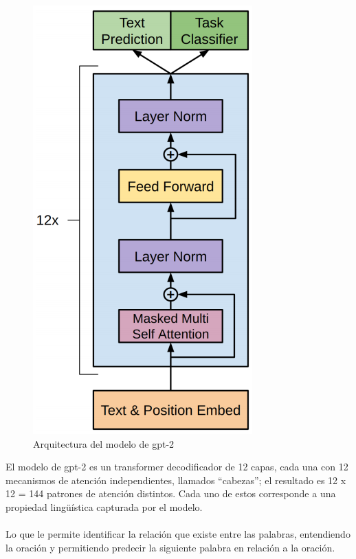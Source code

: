\documentclass[12pt, a4paper, titlepage]{report}
\begin{document}
		    	\begin{figure}[H] 
		    		\includegraphics[scale=.5]{./imagenes/MarcoTeorico/GPTransformer.png}
		    		\centering 
		    		\caption{Arquitectura del modelo de \acrshort{gpt}-2 \cite{refarquitecturagpt}}
		    	\end{figure}
		    
		    	El modelo de \acrshort{gpt}-2 es un transformer decodificador de 12 capas, cada una con 12 mecanismos de atención independientes, llamados “cabezas”; el resultado es 12 x 12 = 144 patrones de atención distintos. Cada uno de estos corresponde a una propiedad lingüística capturada por el modelo. \cite{refarquitecturagpt2} \\\\
		    	Lo que le permite identificar la relación que existe entre las palabras, entendiendo la oración y permitiendo predecir la siguiente palabra en relación a la oración.\par
		    	
\end{document}
